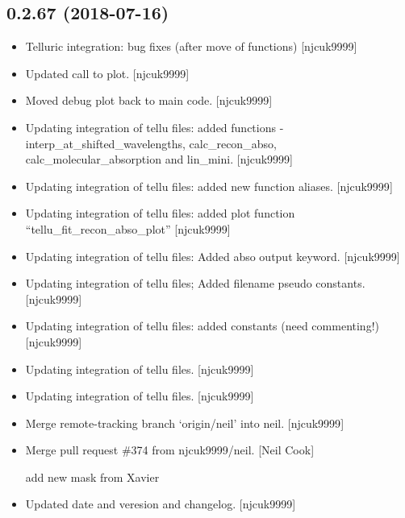 \documentclass[a4paper,10pt,english]{report}
\begin{document}
\subsection{0.2.67 (2018-07-16)}
\label{\detokenize{misc/changelog:id390}}\begin{itemize}
\item {} 
Telluric integration: bug fixes (after move of functions) {[}njcuk9999{]}

\item {} 
Updated call to plot. {[}njcuk9999{]}

\item {} 
Moved debug plot back to main code. {[}njcuk9999{]}

\item {} 
Updating integration of tellu files: added functions -
interp\_at\_shifted\_wavelengths, calc\_recon\_abso,
calc\_molecular\_absorption and lin\_mini. {[}njcuk9999{]}

\item {} 
Updating integration of tellu files: added new function aliases.
{[}njcuk9999{]}

\item {} 
Updating integration of tellu files: added plot function
“tellu\_fit\_recon\_abso\_plot” {[}njcuk9999{]}

\item {} 
Updating integration of tellu files: Added abso output keyword.
{[}njcuk9999{]}

\item {} 
Updating integration of tellu files; Added filename pseudo constants.
{[}njcuk9999{]}

\item {} 
Updating integration of tellu files: added constants (need
commenting!) {[}njcuk9999{]}

\item {} 
Updating integration of tellu files. {[}njcuk9999{]}

\item {} 
Updating integration of tellu files. {[}njcuk9999{]}

\item {} 
Merge remote-tracking branch ‘origin/neil’ into neil. {[}njcuk9999{]}

\item {} 
Merge pull request \#374 from njcuk9999/neil. {[}Neil Cook{]}

add new mask from Xavier

\item {} 
Updated date and veresion and changelog. {[}njcuk9999{]}

\end{itemize}
\end{document}

